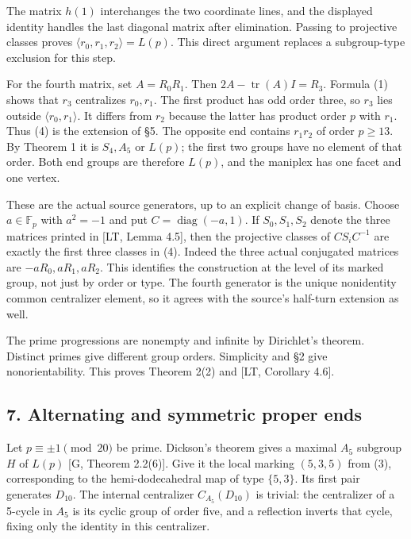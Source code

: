 \documentclass[
  11pt,
]{article}
\newcounter{none} %
\begin{document}
The matrix \(h(1)\) interchanges the two coordinate lines, and the
displayed identity handles the last diagonal matrix after elimination.
Passing to projective classes proves
\(\langle r_0,r_1,r_2\rangle=L(p)\). This direct argument replaces a
subgroup-type exclusion for this step.

For the fourth matrix, set \(A=R_0R_1\). Then
\(2A-\operatorname{tr}(A)I=R_3\). Formula (1) shows that \(r_3\)
centralizes \(r_0,r_1\). The first product has odd order three, so
\(r_3\) lies outside \(\langle r_0,r_1\rangle\). It differs from \(r_2\)
because the latter has product order \(p\) with \(r_1\). Thus (4) is the
extension of §5. The opposite end contains \(r_1r_2\) of order
\(p\ge13\). By Theorem 1 it is \(S_4,A_5\) or \(L(p)\); the first two
groups have no element of that order. Both end groups are therefore
\(L(p)\), and the maniplex has one facet and one vertex.

These are the actual source generators, up to an explicit change of
basis. Choose \(a\in\mathbb F_p\) with \(a^2=-1\) and put
\(C=\operatorname{diag}(-a,1)\). If \(S_0,S_1,S_2\) denote the three
matrices printed in {[}LT, Lemma 4.5{]}, then the projective classes of
\(CS_iC^{-1}\) are exactly the first three classes in (4). Indeed the
three actual conjugated matrices are \(-aR_0,aR_1,aR_2\). This
identifies the construction at the level of its marked group, not just
by order or type. The fourth generator is the unique nonidentity common
centralizer element, so it agrees with the source's half-turn extension
as well.

The prime progressions are nonempty and infinite by Dirichlet's theorem.
Distinct primes give different group orders. Simplicity and §2 give
nonorientability. This proves Theorem 2(2) and {[}LT, Corollary 4.6{]}.

\subsection{7. Alternating and symmetric proper
ends}\label{alternating-and-symmetric-proper-ends}

Let \(p\equiv\pm1\pmod{20}\) be prime. Dickson's theorem gives a maximal
\(A_5\) subgroup \(H\) of \(L(p)\) {[}G, Theorem 2.2(6){]}. Give it the
local marking \((5,3,5)\) from (3), corresponding to the
hemi-dodecahedral map of type \(\{5,3\}\). Its first pair generates
\(D_{10}\). The internal centralizer \(C_{A_5}(D_{10})\) is trivial: the
centralizer of a 5-cycle in \(A_5\) is its cyclic group of order five,
and a reflection inverts that cycle, fixing only the identity in this
centralizer.
\end{document}
